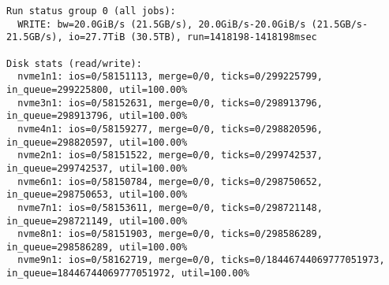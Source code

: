 \begin{verbatim}
Run status group 0 (all jobs):
  WRITE: bw=20.0GiB/s (21.5GB/s), 20.0GiB/s-20.0GiB/s (21.5GB/s-21.5GB/s), io=27.7TiB (30.5TB), run=1418198-1418198msec

Disk stats (read/write):
  nvme1n1: ios=0/58151113, merge=0/0, ticks=0/299225799, in_queue=299225800, util=100.00%
  nvme3n1: ios=0/58152631, merge=0/0, ticks=0/298913796, in_queue=298913796, util=100.00%
  nvme4n1: ios=0/58159277, merge=0/0, ticks=0/298820596, in_queue=298820597, util=100.00%
  nvme2n1: ios=0/58151522, merge=0/0, ticks=0/299742537, in_queue=299742537, util=100.00%
  nvme6n1: ios=0/58150784, merge=0/0, ticks=0/298750652, in_queue=298750653, util=100.00%
  nvme7n1: ios=0/58153611, merge=0/0, ticks=0/298721148, in_queue=298721149, util=100.00%
  nvme8n1: ios=0/58151903, merge=0/0, ticks=0/298586289, in_queue=298586289, util=100.00%
  nvme9n1: ios=0/58162719, merge=0/0, ticks=0/18446744069777051973, in_queue=18446744069777051972, util=100.00%
\end{verbatim}

